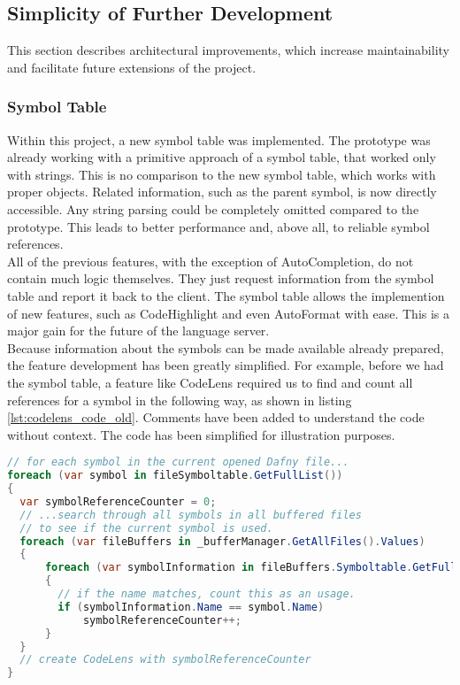 \subsection{Simplicity of Further Development}
This section describes architectural improvements,
which increase maintainability and facilitate future extensions of the project.

\subsubsection{Symbol Table}
Within this project, a new symbol table was implemented.
The prototype was already working with a primitive approach of a symbol table, that worked only with strings.
This is no comparison to the new symbol table, which works with proper objects.
Related information, such as the parent symbol, is now directly accessible.
Any string parsing could be completely omitted compared to the prototype.
This leads to better performance and, above all, to reliable symbol references.\\

All of the previous features, with the exception of AutoCompletion, do not contain much logic themselves.
They just request information from the symbol table and report it back to the client.
The symbol table allows the implemention of new features, such as CodeHighlight and even AutoFormat with ease.
This is a major gain for the future of the language server.\\


Because information about the symbols can be made available already prepared,
the feature development has been greatly simplified.
For example, before we had the symbol table,
a feature like CodeLens required us to find and count all references for a symbol in the following way,
as shown in listing \ref{lst:codelens_code_old}.
Comments have been added to understand the code without context.
The code has been simplified for illustration purposes.

\begin{lstlisting}[language=csharp, caption={Example for CodeLens in the Prototype}, captionpos=b, label={lst:codelens_code_old}]
// for each symbol in the current opened Dafny file...
foreach (var symbol in fileSymboltable.GetFullList())
{
  var symbolReferenceCounter = 0;
  // ...search through all symbols in all buffered files
  // to see if the current symbol is used.
  foreach (var fileBuffers in _bufferManager.GetAllFiles().Values)
  {
      foreach (var symbolInformation in fileBuffers.Symboltable.GetFullList())
      {
        // if the name matches, count this as an usage.
        if (symbolInformation.Name == symbol.Name)
            symbolReferenceCounter++;
      }
  }
  // create CodeLens with symbolReferenceCounter
}
\end{lstlisting}

